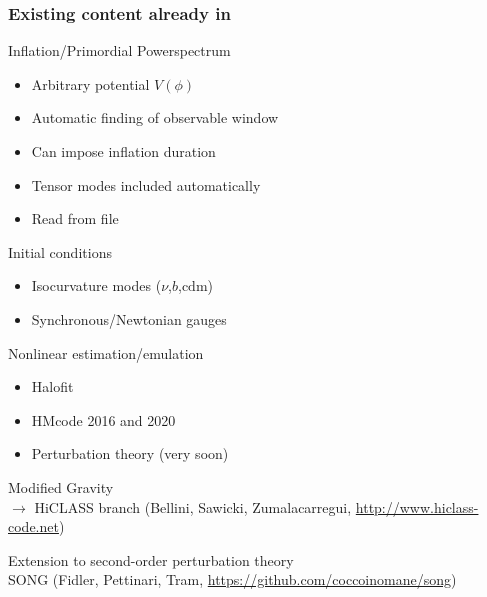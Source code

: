 \begin{frame}[fragile]
	\frametitle{Existing content already in \CLASS{}}
	
	\pause
	Inflation/Primordial Powerspectrum
	\begin{itemize}
		\item Arbitrary potential $V(\phi)$
		\item Automatic finding of observable window
		\item Can impose inflation duration
		\item Tensor modes included automatically
		\item Read from file
	\end{itemize}

	\pause
	Initial conditions
	\begin{itemize}
		\item Isocurvature modes ($\nu$,$b$,$\mathrm{cdm}$)
		\item Synchronous/Newtonian gauges
	\end{itemize}

	\pause
	Nonlinear estimation/emulation
	\begin{itemize}
	\item Halofit
	\item HMcode 2016 and 2020
	\item Perturbation theory (very soon)
	\end{itemize}

	\pause
	Modified Gravity\\
	$\to$ {\Red HiCLASS} branch (Bellini, Sawicki, Zumalacarregui, \url{http://www.hiclass-code.net})
	
	\vspace*{0.5\baselineskip}
	\pause
	Extension to {\Red second-order perturbation theory}\\ SONG (Fidler, Pettinari, Tram, \url{https://github.com/coccoinomane/song})
\end{frame}

